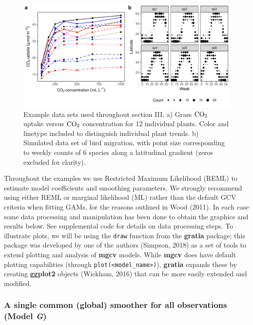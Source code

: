 \documentclass[12pt]{article}
\begin{document}
\begin{figure}
\includegraphics[width=\linewidth]{../figures/vis_data-1} \caption{\label{fig:vis_data}Example data sets used throughout section III. a) Grass $\text{CO}\textsubscript{2}$ uptake versus $\text{CO}\textsubscript{2}$ concentration for 12 individual plants. Color and linetype included to distinguish individual plant trends. b) Simulated data set of bird migration, with point size corresponding to weekly counts of 6 species along a latitudinal gradient (zeros excluded for clarity). }\label{fig:vis_data}
\end{figure}

Throughout the examples we use Restricted Maximum Likelihood (REML) to
estimate model coefficients and smoothing parameters. We strongly
recommend using either REML or marginal likelihood (ML) rather than the
default GCV criteria when fitting GAMs, for the reasons outlined in Wood
(2011). In each case some data processing and manipulation has been done
to obtain the graphics and results below. See supplemental code for
details on data processing steps. To illustrate plots, we will be using
the \texttt{draw} function from the \textbf{gratia} package; this
package was developed by one of the authors (Simpson, 2018) as a set of
tools to extend plotting and analysis of \textbf{mgcv} models. While
\textbf{mgcv} does have default plotting capabilities (through
\texttt{plot(\textless{}model\_name\textgreater{})}), \textbf{gratia}
expands these by creating \textbf{ggplot2} objects (Wickham, 2016) that
can be more easily extended and modified.

\subsubsection{\texorpdfstring{A single common (global) smoother for all
observations (Model
\emph{G})}{A single common (global) smoother for all observations (Model G)}}\label{a-single-common-global-smoother-for-all-observations-model-g}
\end{document}
